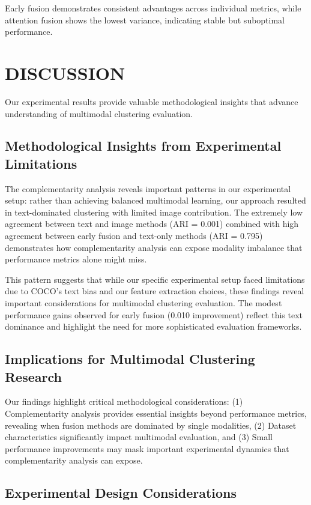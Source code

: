 \documentclass[sigconf]{acmart}
\begin{document}
Early fusion demonstrates consistent advantages across individual metrics, while attention fusion shows the lowest variance, indicating stable but suboptimal performance.

\section{DISCUSSION}

Our experimental results provide valuable methodological insights that advance understanding of multimodal clustering evaluation.

\subsection{Methodological Insights from Experimental Limitations}

The complementarity analysis reveals important patterns in our experimental setup: rather than achieving balanced multimodal learning, our approach resulted in text-dominated clustering with limited image contribution. The extremely low agreement between text and image methods (ARI = 0.001) combined with high agreement between early fusion and text-only methods (ARI = 0.795) demonstrates how complementarity analysis can expose modality imbalance that performance metrics alone might miss.

This pattern suggests that while our specific experimental setup faced limitations due to COCO's text bias and our feature extraction choices, these findings reveal important considerations for multimodal clustering evaluation. The modest performance gains observed for early fusion (0.010 improvement) reflect this text dominance and highlight the need for more sophisticated evaluation frameworks.

\subsection{Implications for Multimodal Clustering Research}

Our findings highlight critical methodological considerations: (1) Complementarity analysis provides essential insights beyond performance metrics, revealing when fusion methods are dominated by single modalities, (2) Dataset characteristics significantly impact multimodal evaluation, and (3) Small performance improvements may mask important experimental dynamics that complementarity analysis can expose.

\subsection{Experimental Design Considerations}
\end{document}
